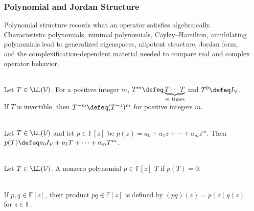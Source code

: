 \subsubsection{Polynomial and Jordan Structure}

Polynomial structure records what an operator satisfies algebraically. Characteristic polynomials, minimal polynomials, Cayley--Hamilton, annihilating polynomials lead to generalized eigenspaces, nilpotent structure, Jordan form, and the complexification-dependent material needed to compare real and complex operator behavior.

\begin{definition} \label{def:operator-powers} \\
Let $T\in\LL(\mathcal{V})$. For a positive integer $m$, $T^m\defeq \underbrace{T\cdots T}_{m\text{ times}}$ and $T^0\defeq I_{\mathcal{V}}$.\\
If $T$ is invertible, then $T^{-m}\defeq(T^{-1})^m$ for positive integers $m$.
\end{definition}

\begin{definition} \label{def:polynomial-applied-to-operator} \\
Let $T\in\LL(\mathcal{V})$ and let $p\in\mathbb{F}[z]$ be $p(z)=a_0+a_1z+\cdots+a_mz^m$. Then $p(T)\defeq a_0I_{\mathcal{V}}+a_1T+\cdots+a_mT^m$.
\end{definition}

\begin{definition} \label{def:annihilating-polynomial} \\
Let $T\in\LL(\mathcal{V})$. A nonzero polynomial $p\in\mathbb{F}[z]$  $T$ if $p(T)=0$.
\end{definition}

\begin{definition} \label{def:product-of-polynomials} \\
If $p,q\in\mathbb{F}[z]$, their product $pq\in\mathbb{F}[z]$ is defined by $(pq)(z)=p(z)q(z)$ for $z\in\mathbb{F}$.
\end{definition}

